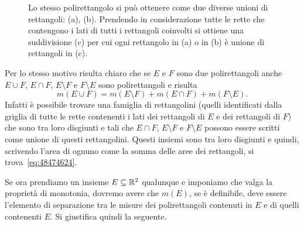 \begin{figure}
  \hfill
  \subcaptionbox{}
  {}
  \hfill
  \subcaptionbox{}
  {}
  \hfill
  \subcaptionbox{}
  {}
  \hfill\mbox{}
  \caption{Lo stesso polirettangolo si può ottenere
  come due diverse unioni di rettangoli: (a), (b). Prendendo in considerazione
  tutte le rette che contengono i lati di tutti i rettangoli coinvolti si
  ottiene una suddivisione (c) per cui ogni rettangolo in (a) o in (b) è unione di rettangoli in (c).}
\end{figure}

Per lo stesso motivo risulta chiaro che se $E$ e $F$ sono due polirettangoli
anche $E\cup F$, $E \cap F$, $E\setminus F$  e $F\setminus E$ sono polirettangoli e risulta
\begin{equation}\label{eq:48474624}
  m(E \cup F) = m(E\setminus F) + m(E\cap F) + m(F\setminus E).
\end{equation}
Infatti è possibile trovare una famiglia di rettangolini (quelli identificati
dalla griglia di tutte le rette contenenti i lati dei rettangoli di $E$ e dei rettangoli di $F$)
che sono tra loro disgiunti e tali che
$E\cap F$, $E\setminus F$ e $F\setminus E$
possono essere scritti come unione di questi rettangolini. Questi insiemi
sono tra loro disgiunti e quindi, scrivendo l'area di ognuno come la somma delle
aree dei rettangoli, si trova~\eqref{eq:48474624}.

Se ora prendiamo un insieme $E\subseteq {\mathbb R}^2$ qualunque
e imponiamo che valga la proprietà di monotonia,
dovremo avere che $m(E)$, se è definibile, deve
essere l'elemento di separazione tra le misure
dei polirettangoli contenuti in $E$ e di quelli contenenti $E$.
Si giustifica quindi la seguente.

